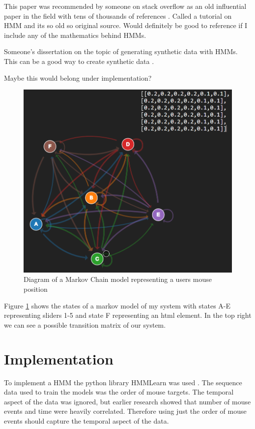 \documentclass{article}
\begin{document}
This paper was recommended by someone on stack overflow as an old influential paper in the field with tens of thousands of references \cite{rabiner1989tutorial}.
Called a tutorial on HMM and its so old so original source. 
Would definitely be good to reference if I include any of the mathematics behind HMMs. 

Someone's dissertation on the topic of generating synthetic data with HMMs.
This can be a good way to create synthetic data \cite{ferrando2018generating}.

Maybe this would belong under implementation?
\begin{figure}[ht]
    \centering
    \includegraphics[scale=0.4]{Images/HMM-Example-Diagram.png}
    \caption{Diagram of a Markov Chain model representing a users mouse position}
    \label{fig:Markov}
\end{figure}

Figure \ref{fig:Markov} shows the states of a markov model of my system with states A-E representing sliders 1-5 and state F representing an html element.
In the top right we can see a possible transition matrix of our system.

\section{Implementation}

To implement a HMM the python library HMMLearn was used \cite{hmmlearn}.
The sequence data used to train the models was the order of mouse targets.
The temporal aspect of the data was ignored, but earlier research showed that number of mouse events and time were heavily correlated.
Therefore using just the order of mouse events should capture the temporal aspect of the data.
\end{document}

